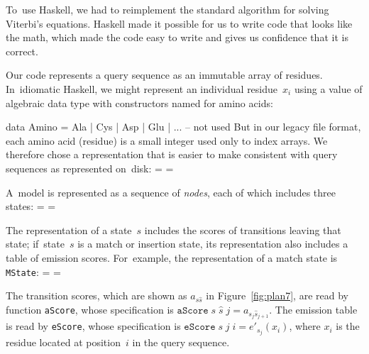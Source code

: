 \documentclass[]{jfp1}
\newcommand\txprobxj[3][]{a#1_{{#2}_{j}{#3}_{j+1}}}  %
\newcommand\figref[1]{Figure~\ref{fig:#1}}
\newcommand\seclabel[1]{\label{sec:#1}}
\newif\ifverbatimsmall
\newenvironment{smallverbatim}{\par\small\verbatimsmalltrue\verbatim}{\endverbatim}
\newcommand\smallverbatiminput[1]{%
  \verbatimsmalltrue
  \presvtopsep=\topsep
  \topsep=0.78\topsep
  \verbatimsmallfalse
  \topsep=\presvtopsep
}
\begin{document}
To~use Haskell, we had to reimplement the standard
algorithm for solving Viterbi's equations.
Haskell made it possible for us to write code that looks like the
math,
which made the code easy to write and gives us confidence that it is
correct.

Our code represents a query sequence as an immutable array of residues.
In~idiomatic Haskell, 
we might represent an individual residue~$x_i$
using a value of algebraic data type with constructors named for
amino acids:
\begin{smallverbatim}
data Amino = Ala | Cys | Asp | Glu | ...   -- not used
\end{smallverbatim}
But in our
legacy file format, each amino acid (residue) is a small integer
used only to index arrays.
We therefore chose a representation that is easier to make consistent
with query sequences as represented on~disk:
\smallverbatiminput{aa}




A~model is represented as a sequence of \emph{nodes}, 
each of which includes three states:\label{code:model3-node}
\smallverbatiminput{model3-node}
The representation of a state~$s$ includes the scores of transitions leaving
that state;
if~state~$s$ is a match or insertion state, its representation also
includes a table of emission scores.
For~example, the representation of a match state is \texttt{MState}:
\smallverbatiminput{model3-mstate}
%
The transition scores, which are shown as $a_{s\hat s}$
in \figref{plan7}, are read by  
function \texttt{aScore}, 
whose
specification is
\mbox{$\mathtt{aScore}\;s\;\hat s\;j = \txprobxj s {\hat s}$}.\seclabel{aScore}
The
emission table is read by 
\texttt{eScore}, whose specification
is %
\mbox{$\mathtt{eScore}\;s\;j\;i = e'_{s_j}(x_i)$},
where $x_i$ is the residue located at position~$i$ in the query
sequence. 
%
\end{document}

